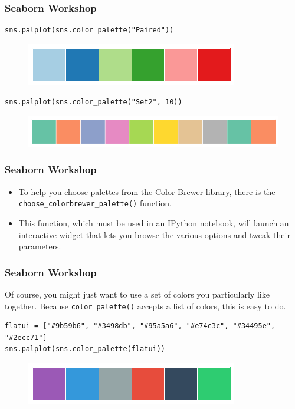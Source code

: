 \documentclass{beamer}
\begin{document}
\begin{frame}[fragile]
	\frametitle{Seaborn Workshop}
	\large
\begin{verbatim}
sns.palplot(sns.color_palette("Paired"))
\end{verbatim}

\begin{figure}
\centering
\includegraphics[width=0.7\linewidth]{images/color_palettes_16_0}
\end{figure}
\bigskip
\begin{verbatim}
sns.palplot(sns.color_palette("Set2", 10))
\end{verbatim}
\begin{figure}
\centering
\includegraphics[width=0.7\linewidth]{images/color_palettes_17_0}

\end{figure}
\end{frame}
\begin{frame}[fragile]
	\frametitle{Seaborn Workshop}
	\large
	\begin{itemize}
\item To help you choose palettes from the Color Brewer library, there is the \texttt{choose\_colorbrewer\_palette()} function.
\item This function, which must be used in an IPython notebook, will launch an interactive widget that lets you browse the various options and tweak their parameters.
	\end{itemize}

\end{frame}
\begin{frame}[fragile]
\frametitle{Seaborn Workshop}
\large

Of course, you might just want to use a set of colors you particularly like together. Because \texttt{color\_palette()} accepts a list of colors, this is easy to do.
\begin{verbatim}
flatui = ["#9b59b6", "#3498db", "#95a5a6", "#e74c3c", "#34495e", "#2ecc71"]
sns.palplot(sns.color_palette(flatui))
\end{verbatim}
\begin{figure}
	\centering
	\includegraphics[width=0.7\linewidth]{images/color_palettes_19_0}
\end{figure}
\end{frame}
\end{document}
